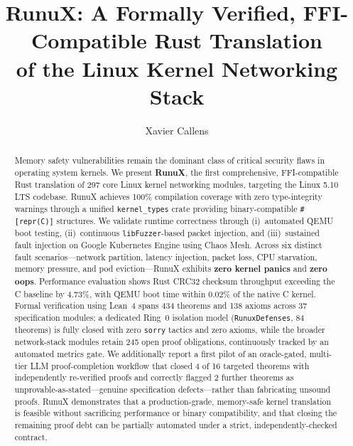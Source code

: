 \documentclass[sigconf,nonacm=false]{acmart}
\begin{document}
\title{RunuX: A Formally Verified, FFI-Compatible Rust Translation\\of the Linux Kernel Networking Stack}

\author{Xavier Callens}

\begin{abstract}
Memory safety vulnerabilities remain the dominant class of critical security flaws in operating system kernels. We present \textbf{RunuX}, the first comprehensive, FFI-compatible Rust translation of 297 core Linux kernel networking modules, targeting the Linux 5.10 LTS codebase. RunuX achieves 100\% compilation coverage with zero type-integrity warnings through a unified \texttt{kernel\_types} crate providing binary-compatible \texttt{\#[repr(C)]} structures. We validate runtime correctness through (i)~automated QEMU boot testing, (ii)~continuous \texttt{libFuzzer}-based packet injection, and (iii)~sustained fault injection on Google Kubernetes Engine using Chaos Mesh. Across six distinct fault scenarios---network partition, latency injection, packet loss, CPU starvation, memory pressure, and pod eviction---RunuX exhibits \textbf{zero kernel panics} and \textbf{zero oops}. Performance evaluation shows Rust CRC32 checksum throughput exceeding the C baseline by 4.73\%, with QEMU boot time within 0.02\% of the native C kernel. Formal verification using Lean~4 spans 434 theorems and 138 axioms across 37 specification modules; a dedicated Ring~0 isolation model (\texttt{RunuxDefenses}, 84 theorems) is fully closed with zero \texttt{sorry} tactics and zero axioms, while the broader network-stack modules retain 245 open proof obligations, continuously tracked by an automated metrics gate. We additionally report a first pilot of an oracle-gated, multi-tier LLM proof-completion workflow that closed 4 of 16 targeted theorems with independently re-verified proofs and correctly flagged 2 further theorems as unprovable-as-stated---genuine specification defects---rather than fabricating unsound proofs. RunuX demonstrates that a production-grade, memory-safe kernel translation is feasible without sacrificing performance or binary compatibility, and that closing the remaining proof debt can be partially automated under a strict, independently-checked contract.
\end{abstract}
\end{document}
